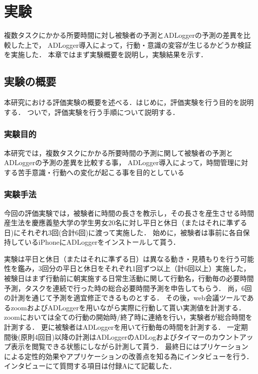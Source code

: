 \chapter{実験}
複数タスクにかかる所要時間に対し被験者の予測とADLoggerの予測の差異を比較した上で，
ADLogger導入によって，行動・意識の変容が生じるかどうか検証を実施した．
本章ではまず実験概要を説明し，実験結果を示す．
\section{実験の概要}
本研究における評価実験の概要を述べる．はじめに，評価実験を行う目的を説明する．
ついで，評価実験を行う手順について説明する．

\subsection{実験目的}
本研究では，複数タスクにかかる所要時間の予測に関して被験者の予測とADLoggerの予測の差異を比較する事，
ADLogger導入によって，時間管理に対する苦手意識・行動への変化が起こる事を目的としている

\subsection{実験手法}
今回の評価実験では，被験者に時間の長さを教示し，その長さを産生させる時間産生法\cite{Oguro1961}\cite{Tayama2018}を慶應義塾大学の学生男女20名に対し平日と休日（またはそれに準ずる日)にそれぞれ3回(合計6回)に渡って実施した．
始めに，被験者は事前に各自保持しているiPhoneにADLoggerをインストールして貰う．

実験は平日と休日（またはそれに準ずる日）は異なる動き・見積もりを行う可能性を鑑み，3回分の平日と休日をそれぞれ1回ずつ以上（計6回以上）実施した，
被験日はまず行動前に朝実施する日常生活動に関して行動名，行動毎の必要時間予測，タスクを連続で行った時の総合必要時間予測を申告してもらう．
尚，6回の計測を通じて予測を適宜修正できるものとする．
その後，web会議ツールであるzoom\cite{zoom}およびADLoggerを用いながら実際に行動して貰い実測値を計測する．
zoomにおいては全ての行動の開始時/終了時に連絡を行い，実験者が総合時間を計測する．
更に被験者はADLoggerを用いて行動毎の時間を計測する．
一定期間後(原則4回目)以降の計測はADLoggerのADLogおよびタイマーのカウントアップ表示を閲覧できる状態にしながら計測して貰う．
最終日にはプリケーションによる定性的効果やアプリケーションの改善点を知る為にインタビューを行う．インタビューにて質問する項目は付録Aにて記載した．

